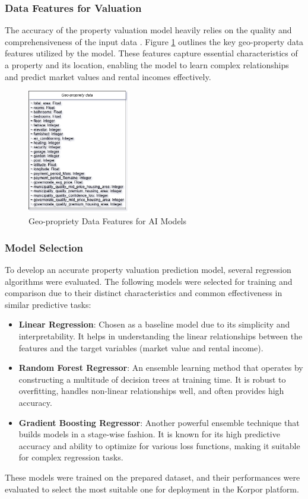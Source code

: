 \subsubsection{Data Features for Valuation}
The accuracy of the property valuation model heavily relies on the quality and comprehensiveness of the input data \cite{PatelAIRealEstate2024}. Figure \ref{fig:geo-propriety-data} outlines the key geo-property data features utilized by the model. These features capture essential characteristics of a property and its location, enabling the model to learn complex relationships and predict market values and rental incomes effectively.
\newpage
\begin{figure}[htbp]
    \centering
    \includegraphics[width=0.4\textwidth]{images/geo-propriety-data.png} %
    \caption{Geo-propriety Data Features for AI Models}
    \label{fig:geo-propriety-data}
\end{figure}

\subsubsection{Model Selection}
To develop an accurate property valuation prediction model, several regression algorithms were evaluated. The following models were selected for training and comparison due to their distinct characteristics and common effectiveness in similar predictive tasks:
\begin{itemize}
    \item \textbf{Linear Regression}: Chosen as a baseline model due to its simplicity and interpretability. It helps in understanding the linear relationships between the features and the target variables (market value and rental income).
    \item \textbf{Random Forest Regressor}: An ensemble learning method that operates by constructing a multitude of decision trees at training time. It is robust to overfitting, handles non-linear relationships well, and often provides high accuracy.
    \item \textbf{Gradient Boosting Regressor}: Another powerful ensemble technique that builds models in a stage-wise fashion. It is known for its high predictive accuracy and ability to optimize for various loss functions, making it suitable for complex regression tasks.
\end{itemize}
These models were trained on the prepared dataset, and their performances were evaluated to select the most suitable one for deployment in the Korpor platform.

